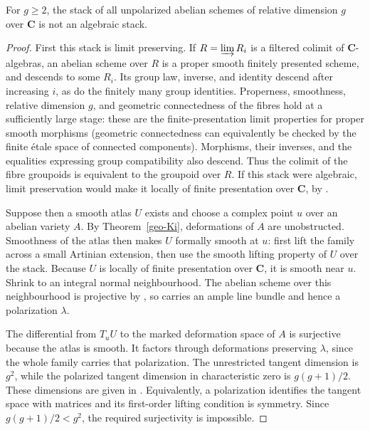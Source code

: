 \begin{proposition}
\label{geo-Ke-unpolarized}
For $g\geq2$, the stack of all unpolarized abelian schemes of relative
dimension $g$ over $\mathbf C$ is not an algebraic stack.
\end{proposition}
\begin{proof}
First this stack is limit preserving. If $R=\varinjlim R_i$ is a filtered
colimit of $\mathbf C$-algebras, an abelian scheme over $R$ is a proper
smooth finitely presented scheme, and descends to some $R_i$. Its group
law, inverse, and identity descend after increasing $i$, as do the
finitely many group identities. Properness, smoothness, relative dimension
$g$, and geometric connectedness of the fibres hold at a sufficiently
large stage: these are the finite-presentation limit properties for
proper smooth morphisms (geometric connectedness can equivalently be
checked by the finite \'etale space of connected components). Morphisms,
their inverses, and the equalities expressing group compatibility also
descend. Thus the colimit of the fibre groupoids is equivalent to the
groupoid over $R$. If this stack were algebraic, limit preservation would
make it locally of finite presentation over $\mathbf C$, by
\cite[Proposition 102.3.8, section tag 0CMQ]{geoStacksStackLimits}.

Suppose then a smooth atlas $U$ exists and choose a complex point $u$ over an
abelian variety $A$. By Theorem~\ref{geo-Ki}, deformations of $A$ are
unobstructed. Smoothness of the atlas then makes $U$ formally smooth at
$u$: first lift the family across a small Artinian extension, then use the
smooth lifting property of $U$ over the stack. Because $U$ is locally of
finite presentation over $\mathbf C$, it is smooth near $u$. Shrink to an
integral normal neighbourhood. The abelian scheme over this neighbourhood
is projective by \cite[\S3(C), p.~258]{Murre1965}, so carries an ample
line bundle and hence a polarization $\lambda$.

The differential from $T_uU$ to the marked deformation space of $A$ is
surjective because the atlas is smooth. It factors through deformations
preserving $\lambda$, since the whole family carries that polarization.
The unrestricted tangent dimension is $g^2$, while the polarized tangent
dimension in characteristic zero is $g(g+1)/2$.
These dimensions are given in \cite[\S2.2, Theorem 2.2.1;
\S2.4, Theorem 2.4.1 and its proof]{Oort1971}.
Equivalently, a polarization identifies the tangent space with matrices
and its first-order lifting condition is symmetry. Since
$g(g+1)/2<g^2$, the required surjectivity is impossible.
\end{proof}

